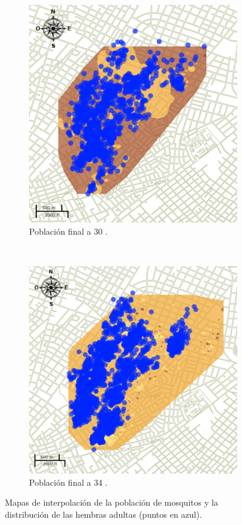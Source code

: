 \begin{figure}[!t]
    \begin{subfigure}[b]{0.225\textwidth}
        \includegraphics[width=\textwidth]{./graphics/temp-30-final.png}
        \caption{ Población final a 30 \textcelsius.}
    \end{subfigure}
    ~~~~
    \begin{subfigure}[b]{0.225\textwidth}
        \includegraphics[width=\textwidth]{./graphics/temp-34-final.png}
        \caption{ Población final a 34 \textcelsius.}
    \end{subfigure}
\caption{\label{fig:poblacion-mapas-all} Mapas de interpolación de la población de mosquitos y la distribución de las hembras adultas (puntos en azul).}
\end{figure}


